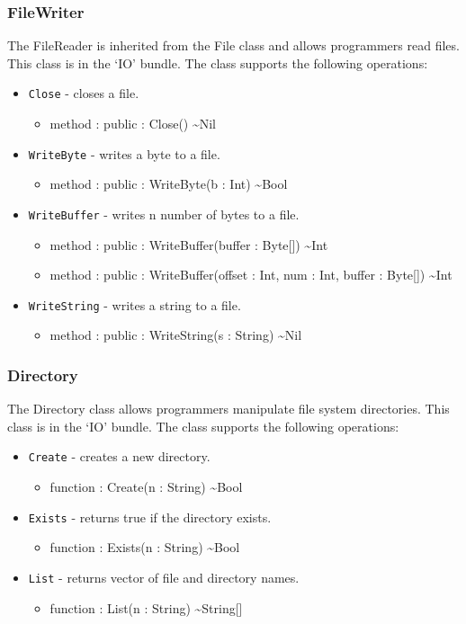 \documentclass[12pt]{article}
\begin{document}
\subsubsection{FileWriter}
The FileReader is inherited from the File class and allows programmers
read files.  This class is in the `IO' bundle.  The class supports the
following operations:
\begin{itemize}
\item \texttt{Close} - closes a file.
  \begin{itemize}
  \item method : public : Close() \textasciitilde Nil
  \end{itemize}
\item \texttt{WriteByte} - writes a byte to a file.
  \begin{itemize}
  \item method : public : WriteByte(b : Int) \textasciitilde Bool
  \end{itemize}
\item \texttt{WriteBuffer} - writes n number of bytes to a file.
  \begin{itemize}
  \item method : public : WriteBuffer(buffer : Byte[]) \textasciitilde Int
  \item method : public : WriteBuffer(offset : Int, num : Int, buffer
    : Byte[]) \textasciitilde Int
  \end{itemize}
\item \texttt{WriteString} - writes a string to a file.
  \begin{itemize}
  \item method : public : WriteString(s : String) \textasciitilde Nil
  \end{itemize}
\end{itemize}

\subsubsection{Directory}
The Directory class allows programmers manipulate file system
directories.  This class is in the `IO' bundle.  The class supports
the following operations:
\begin{itemize}
\item \texttt{Create} - creates a new directory.
  \begin{itemize}
  \item function : Create(n : String) \textasciitilde Bool
  \end{itemize}
\item \texttt{Exists} - returns true if the directory exists.
  \begin{itemize}
  \item function : Exists(n : String) \textasciitilde Bool
  \end{itemize}
\item \texttt{List} - returns vector of file and directory names.
  \begin{itemize}
  \item function : List(n : String) \textasciitilde String[]
  \end{itemize}
\end{itemize}
\end{document}
